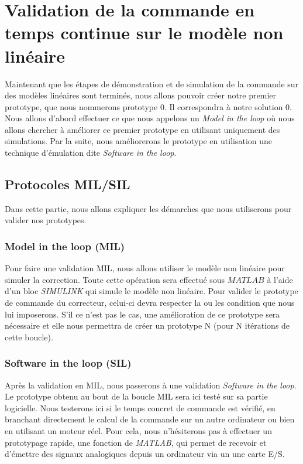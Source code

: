 \chapter{Validation de la commande en temps continue sur le modèle non linéaire}
\label{ValidationCommande}
Maintenant que les étapes de démonstration et de simulation de la commande sur des modèles linéaires sont terminés, nous allons pouvoir créer notre premier prototype, que nous nommerons prototype 0. Il correspondra à notre solution 0. Nous allons d'abord effectuer ce que nous appelons un \emph{Model in the loop} où nous allons chercher à améliorer ce premier prototype en utilisant uniquement des simulations. Par la suite, nous améliorerons le prototype en utilisation une technique d'émulation dite \emph{Software in the loop}.
\section{Protocoles MIL/SIL}\label{sec:prtocoleMIL_SIL}
Dans cette partie, nous allons expliquer les démarches que nous utiliserons pour valider nos prototypes. 
	\subsection{Model in the loop (MIL)}
	Pour faire une validation MIL, nous allons utiliser le modèle non linéaire pour simuler la correction. Toute cette opération sera effectué sous $MATLAB$ à l'aide d'un bloc \emph{SIMULINK} qui simule le modèle non linéaire. Pour valider le prototype de commande du correcteur, celui-ci devra respecter la ou les condition que nous lui imposerons. S'il ce n'est pas le cas, une amélioration de ce prototype sera nécessaire et elle nous permettra de créer un prototype N (pour N itérations de cette boucle). 
	\subsection{Software in the loop (SIL)}
	Après la validation en MIL, nous passerons à une validation \emph{Software in the loop}. Le prototype obtenu au bout de la boucle MIL sera ici testé sur sa partie logicielle. Nous testerons ici si le temps concret de commande est vérifié, en branchant directement le calcul de la commande sur un autre ordinateur ou bien en utilisant un moteur réel. Pour cela, nous n'hésiterons pas à effectuer un prototypage rapide, une fonction de \emph{MATLAB}, qui permet de recevoir et d'émettre des signaux analogiques depuis un ordinateur via un une carte E/S. 
	
